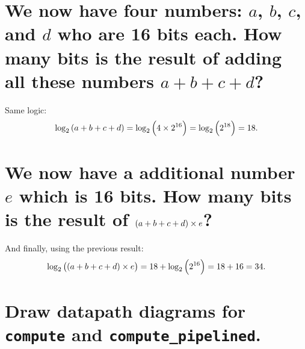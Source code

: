 \documentclass[british,fleqn]{article}
\begin{document}
\section[Task 3]{%
  We now have four numbers: $a$, $b$, $c$, and  $d$ who are 16 bits each. How
  many bits is the result of adding all these numbers $a + b + c + d$?%
}

Same logic:
\begin{equation*}
  \log_2\del{a + b + c + d}   =
  \log_2\del{4\times{2^{16}}} =
  \log_2\del{2^{18}}          = 18.
\end{equation*}

\section[Task 4]{%
  We now have a additional number $e$ which is 16 bits. How many bits is the
  result of $\del{a+b+c+d} \times e$?%
}

And finally, using the previous result: 
\begin{equation*}
  \log_2\del{\del{a + b + c + d}\times e} =
  18 + \log_2\del{2^{16}}                 =
  18 + 16                                 = 34.
\end{equation*}

\section[Task 5]{%
  Draw datapath diagrams for \lstinline{compute} and
  \lstinline{compute_pipelined}.%
}
\end{document}
